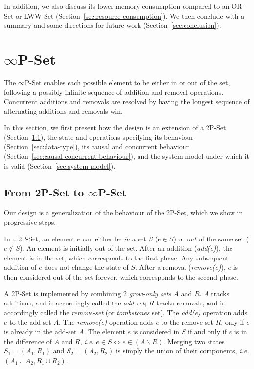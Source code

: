 \documentclass[11pt, oneside]{article}   	%
\begin{document}
In addition, we also discuss its lower memory consumption compared to an OR-Set or LWW-Set (Section~\ref{sec:resource-consumption}). We then conclude with a summary and some directions for future work (Section~\ref{sec:conclusion}).

\section{$\infty$P-Set}
\label{sec:specification}

The $\infty$P-Set enables each possible element to be either in or out of the set, following a possibly infinite sequence of addition and removal operations. Concurrent additions and removals are resolved by having the longest sequence of alternating additions and removals win. 

In this section, we first present how the design is an extension of a 2P-Set (Section~\ref{sec:intuition}), the state and operations specifying its behaviour (Section~\ref{sec:data-type}), its causal and concurrent behaviour (Section~\ref{sec:causal-concurrent-behaviour}), and the system model under which it is valid (Section~\ref{sec:system-model}).

\subsection{From 2P-Set to $\infty$P-Set}
\label{sec:intuition}

Our design is a generalization of the behaviour of the 2P-Set, which we show in progressive steps. 

In a 2P-Set, an element $e$ can either be \textit{in} a set $S$ ($e \in S$) or \textit{out} of the same set ($e \notin S$). An element is initially out of the set. After an addition (\textit{add(e)}), the element is in the set, which corresponds to the first phase. Any subsequent addition of $e$ does not change the state of $S$. After a removal (\textit{remove(e)}), $e$ is then considered out of the set forever, which corresponds to the second phase.

A 2P-Set is implemented by combining 2 \textit{grow-only sets} $A$ and $R$. $A$ tracks additions, and is accordingly called the \textit{add-set}; $R$ tracks removals, and is accordingly called the \textit{remove-set} (or \textit{tombstones} set). The \textit{add(e)} operation adds $e$ to the add-set $A$. The \textit{remove(e)} operation adds $e$ to the remove-set $R$, only if $e$ is already in the add-set $A$. The element $e$ is considered in $S$ if and only if $e$ is in the difference of $A$ and $R$, \textit{i.e.} $e \in S \Leftrightarrow e \in (A\backslash R)$. Merging two states $S_1 = (A_1, R_1)$ and $S_2 = (A_2, R_2)$ is simply the union of their components, \textit{i.e.} $(A_1 \cup A_2, R_1 \cup R_2)$.
\end{document}
